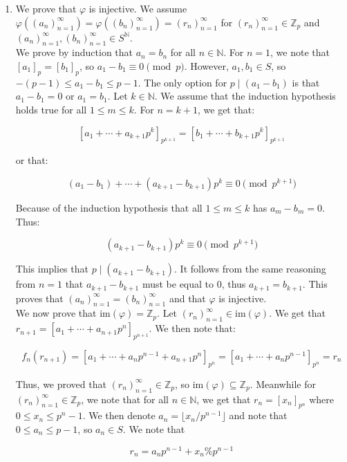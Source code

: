 \documentclass{article}
\begin{document}
\begin{enumerate}
\begin{enumerate}
    \item 
    We prove that $\varphi$ is injective. We assume $\varphi((a_n)_{n=1}^{\infty}) = \varphi((b_n)_{n=1}^{\infty}) = (r_n)^{\infty}_{n=1}$ for $(r_n)^{\infty}_{n=1} \in \mathbb{Z}_p$ and $(a_n)_{n=1}^{\infty}, (b_n)_{n=1}^{\infty} \in S^{\mathbb{N}}$. \\

    We prove by induction that $a_n = b_n$ for all $n \in \mathbb{N}$. For $n = 1$, we note that $[a_1]_p = [b_1]_p$, so $a_1 - b_1 \equiv 0 \pmod {p}$. However, $a_1, b_1 \in S$, so $-(p-1) \leq a_1 - b_1 \leq p-1$. The only option for $p \mid (a_1 - b_1)$ is that $a_1 - b_1 = 0$ or $a_1 = b_1$. Let $k \in \mathbb{N}$. We assume that the induction hypothesis holds true for all $1 \leq m \leq k$. For $n = k + 1$, we get that: 

    $$[a_1 + \cdots + a_{k+1}p^{k}]_{p^{k+1}} = [b_1 + \cdots + b_{k+1}p^{k}]_{p^{k+1}}$$ 

    or that: 

    $$(a_1 - b_1) + \cdots + (a_{k+1} - b_{k+1})p^{k} \equiv 0 \pmod {p^{k+1}}$$

    Because of the induction hypothesis that all $1 \leq m \leq k$ has $a_m - b_m = 0$. Thus: 

    $$(a_{k+1} - b_{k+1})p^{k} \equiv 0 \pmod {p^{k+1}}$$

    This implies that $p \mid (a_{k+1} - b_{k+1})$. It follows from the same reasoning from $n=1$ that $a_{k+1} - b_{k+1}$ must be equal to $0$, thus $a_{k+1} = b_{k+1}$. This proves that $(a_n)^{\infty}_{n=1} = (b_n)^{\infty}_{n=1}$ and that $\varphi$ is injective. \\

    We now prove that $\text{im}(\varphi) = \mathbb{Z}_p$. Let $(r_n)_{n=1}^{\infty} \in \text{im}(\varphi)$. We get that $r_{n+1} = [a_1 + \cdots + a_{n+1}p^n]_{p^{n+1}}$. We then note that: 
    
    
    $$f_n(r_{n+1}) = [a_1 + \cdots + a_{n}p^{n-1} + a_{n+1}p^n]_{p^{n}} = [a_1 + \cdots + a_{n}p^{n-1}]_{p^{n}} = r_n$$

    Thus, we proved that $(r_n)_{n=1}^{\infty} \in \mathbb{Z}_p$, so $\text{im}(\varphi) \subseteq \mathbb{Z}_p$. Meanwhile for $(r_n)_{n=1}^{\infty} \in \mathbb{Z}_p$, we note that for all $n \in \mathbb{N}$, we get that $r_n = [x_n]_{p^n}$ where $0 \leq x_n \leq p^n - 1$. We then denote $a_n = \lfloor x_n / p^{n-1} \rfloor$ and note that $0 \leq a_n \leq p - 1$, so $a_n \in S$. We note that 

    $$r_n = a_n p^{n-1} + x_n \% p^{n-1}$$ 
    

\end{enumerate}
\end{enumerate}
\end{document}
